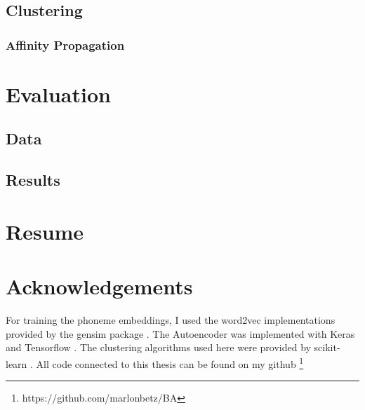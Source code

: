 \documentclass[8pt]{article}
\begin{document}
\subsection{Clustering}
\subsubsection{Affinity Propagation}
\section{Evaluation}
\subsection{Data}
\subsection{Results}
\section{Resume}
\section{Acknowledgements}
For training the phoneme embeddings, I used the word2vec implementations provided by the gensim package \cite{rehurek_lrec}. The Autoencoder was implemented with Keras \cite{chollet2015keras} and Tensorflow \cite{tensorflow2015-whitepaper}. The clustering algorithms used here were provided by scikit-learn \cite{scikit-learn}. All code connected to this thesis can be found on my github \footnote{https://github.com/marlonbetz/BA}




\end{document}
